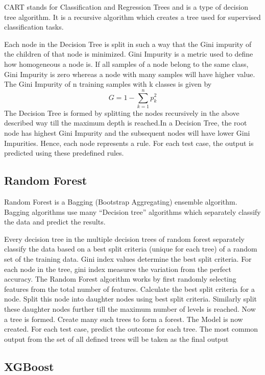 \documentclass[preprint,12pt]{elsarticle}
\begin{document}
CART stands for Classification and Regression Trees and is a type of decision tree algorithm. It is a recursive algorithm which creates a tree used for supervised classification tasks.

Each node in the Decision Tree is split in such a way that the Gini impurity of the children of that node is minimized. Gini Impurity is a metric used to define how homogeneous a node is. If all samples of a node belong to the same class, Gini Impurity is zero whereas a node with many samples will have higher value. The Gini Impurity of n training samples with k classes is given by 
\begin{equation}
G = 1 - \sum_{k = 1}^{n}p_k^2
\end{equation}
The Decision Tree is formed by splitting the nodes recursively in the above described way till the maximum depth is reached.In a Decision Tree, the root node has highest Gini Impurity and the subsequent nodes will have lower Gini Impurities. Hence, each node represents a rule. For each test case, the output is predicted using these predefined rules.


\subsection{Random Forest}
Random Forest \cite{random_forest} is a Bagging (Bootstrap Aggregating) ensemble algorithm. Bagging algorithms use many “Decision tree” algorithms which separately classify the data and predict the results. 

Every decision tree in the multiple decision trees of random forest separately classify the data based on a best split criteria (unique for each tree) of a random set of the training data. Gini index values determine the best split criteria. For each node in the tree, gini index measures the variation from the perfect accuracy. The Random Forest algorithm works by first randomly selecting features from the total number of features. Calculate the best split criteria for a node. Split this node into daughter nodes using best split criteria. Similarly split these daughter nodes further till the maximum number of levels is reached. Now a tree is formed. Create many such trees to form a forest. The Model is now created. For each test case, predict the outcome for each tree. The most common output from the set of all defined trees will be taken as the final output


\subsection{XGBoost}
\end{document}
